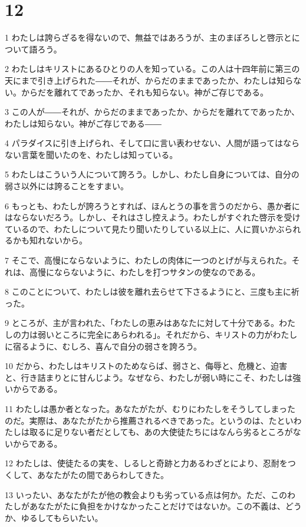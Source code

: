 \chapter{12}

\par 1 わたしは誇らざるを得ないので、無益ではあろうが、主のまぼろしと啓示とについて語ろう。
\par 2 わたしはキリストにあるひとりの人を知っている。この人は十四年前に第三の天にまで引き上げられた――それが、からだのままであったか、わたしは知らない。からだを離れてであったか、それも知らない。神がご存じである。
\par 3 この人が――それが、からだのままであったか、からだを離れてであったか、わたしは知らない。神がご存じである――
\par 4 パラダイスに引き上げられ、そして口に言い表わせない、人間が語ってはならない言葉を聞いたのを、わたしは知っている。
\par 5 わたしはこういう人について誇ろう。しかし、わたし自身については、自分の弱さ以外には誇ることをすまい。
\par 6 もっとも、わたしが誇ろうとすれば、ほんとうの事を言うのだから、愚か者にはならないだろう。しかし、それはさし控えよう。わたしがすぐれた啓示を受けているので、わたしについて見たり聞いたりしている以上に、人に買いかぶられるかも知れないから。
\par 7 そこで、高慢にならないように、わたしの肉体に一つのとげが与えられた。それは、高慢にならないように、わたしを打つサタンの使なのである。
\par 8 このことについて、わたしは彼を離れ去らせて下さるようにと、三度も主に祈った。
\par 9 ところが、主が言われた、「わたしの恵みはあなたに対して十分である。わたしの力は弱いところに完全にあらわれる」。それだから、キリストの力がわたしに宿るように、むしろ、喜んで自分の弱さを誇ろう。
\par 10 だから、わたしはキリストのためならば、弱さと、侮辱と、危機と、迫害と、行き詰まりとに甘んじよう。なぜなら、わたしが弱い時にこそ、わたしは強いからである。
\par 11 わたしは愚か者となった。あなたがたが、むりにわたしをそうしてしまったのだ。実際は、あなたがたから推薦されるべきであった。というのは、たといわたしは取るに足りない者だとしても、あの大使徒たちにはなんら劣るところがないからである。
\par 12 わたしは、使徒たるの実を、しるしと奇跡と力あるわざとにより、忍耐をつくして、あなたがたの間であらわしてきた。
\par 13 いったい、あなたがたが他の教会よりも劣っている点は何か。ただ、このわたしがあなたがたに負担をかけなかったことだけではないか。この不義は、どうか、ゆるしてもらいたい。
